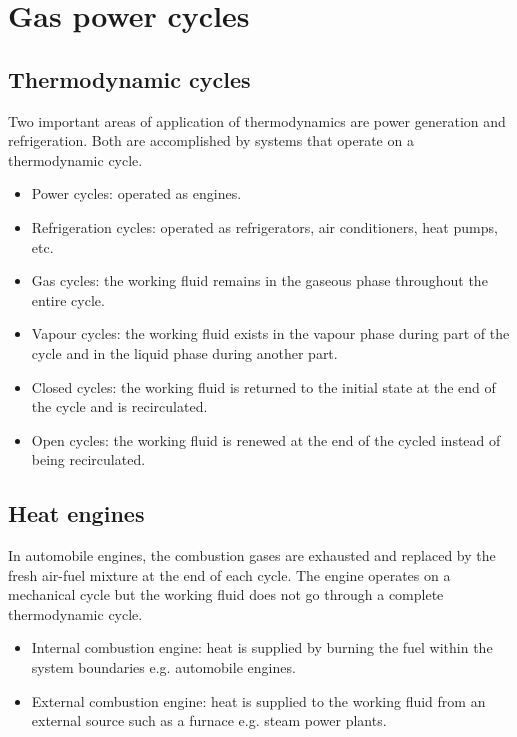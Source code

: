 \documentclass[class=report, crop=false, 12pt,a4paper]{standalone}
\begin{document}
\section{Gas power cycles}
\subsection{Thermodynamic cycles}
Two important areas of application of thermodynamics are power generation and refrigeration. Both are accomplished by systems that operate on a thermodynamic cycle.
\begin{itemize}[noitemsep]
  \item Power cycles: operated as engines.
  \item Refrigeration cycles: operated as refrigerators, air conditioners, heat pumps, etc.
  \item Gas cycles: the working fluid remains in the gaseous phase throughout the entire cycle.
  \item Vapour cycles: the working fluid exists in the vapour phase during part of the cycle and in the liquid phase during another part. 
  \item Closed cycles: the working fluid is returned to the initial state at the end of the cycle and is recirculated.
  \item Open cycles: the working fluid is renewed at the end of the cycled instead of being recirculated.
\end{itemize}
\subsection{Heat engines}
In automobile engines, the combustion gases are exhausted and replaced by the fresh air-fuel mixture at the end of each cycle. The engine operates on a mechanical cycle but the working fluid does not go through a complete thermodynamic cycle. 
\begin{itemize}[noitemsep]
  \item Internal combustion engine: heat is supplied by burning the fuel within the system boundaries e.g. automobile engines.
  \item External combustion engine: heat is supplied to the working fluid from an external source such as a furnace e.g. steam power plants.
\end{itemize}
\end{document}
